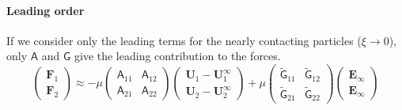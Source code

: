 \documentclass[12pt]{article}
\newcommand{\tens}[1]{\bm{\mathsf{#1}}}
\begin{document}
\paragraph{Leading order}
If we consider only the leading terms for 
the nearly contacting particles ($\xi \to 0$),
only $\tens{A}$ and $\tens{G}$ give the leading contribution to the forces.
\begin{equation}
 \begin{pmatrix}
  \bm{F}_{1} \\
  \bm{F}_{2} 
 \end{pmatrix}
\approx
- \mu
\begin{pmatrix}
\tens{A}_{11} &
\tens{A}_{12}  \\
\tens{A}_{21}  &
\tens{A}_{22}  
\end{pmatrix}
 \begin{pmatrix}
  \bm{U}_{1} -  \bm{U}_{1}^{\infty}\\
  \bm{U}_{2} -  \bm{U}_{2}^{\infty}
 \end{pmatrix}
 + \mu
\begin{pmatrix}
\tilde{\tens{G}}_{11} &
\tilde{\tens{G}}_{12}  \\
\tilde{\tens{G}}_{21}  &
\tilde{\tens{G}}_{22}  
\end{pmatrix}
 \begin{pmatrix}
\bm{E}_{\infty} \\ \bm{E}_{\infty}
\end{pmatrix}
\end{equation}
\end{document}
